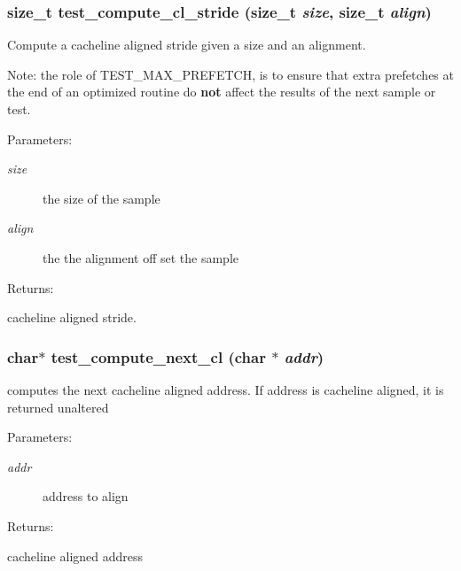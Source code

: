 \subsubsection{\setlength{\rightskip}{0pt plus 5cm}size\_\-t test\_\-compute\_\-cl\_\-stride (size\_\-t {\em size}, size\_\-t {\em align})}\label{test__utils_8h_a40}


Compute a cacheline aligned stride given a size and an alignment.

Note: the role of TEST\_\-MAX\_\-PREFETCH, is to ensure that extra prefetches at the end of an optimized routine do {\bf not} affect the results of the next sample or test.\begin{Desc}
\item[Parameters: ]\par
\begin{description}
\item[{\em 
size}]the size of the sample \item[{\em 
align}]the the alignment off set the sample \end{description}
\end{Desc}
\begin{Desc}
\item[Returns: ]\par
cacheline aligned stride. \end{Desc}
\subsubsection{\setlength{\rightskip}{0pt plus 5cm}char$\ast$ test\_\-compute\_\-next\_\-cl (char $\ast$ {\em addr})}\label{test__utils_8h_a42}


computes the next cacheline aligned address. If address is cacheline aligned, it is returned unaltered

\begin{Desc}
\item[Parameters: ]\par
\begin{description}
\item[{\em 
addr}]address to align \end{description}
\end{Desc}
\begin{Desc}
\item[Returns: ]\par
cacheline aligned address \end{Desc}
